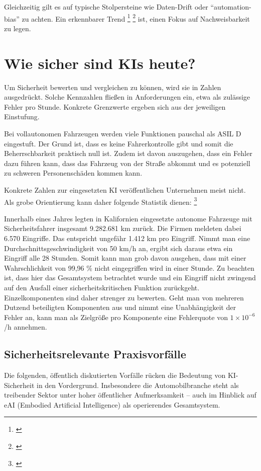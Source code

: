 Gleichzeitig gilt es auf typische Stolpersteine wie Daten-Drift oder ``automation-bias'' zu achten. 
Ein erkennbarer Trend 
\footnote{ \parencite{conduit2017-superalloy-nn}} \footnote{ \parencite{alphafold-nature-2021}}
ist, einen Fokus auf Nachweisbarkeit zu legen.



\section{Wie sicher sind KIs heute?}
Um Sicherheit bewerten und vergleichen zu können, wird sie in Zahlen ausgedrückt. 
Solche Kennzahlen fließen in Anforderungen ein, etwa als zulässige Fehler pro Stunde. 
Konkrete Grenzwerte ergeben sich aus der jeweiligen Einstufung.

Bei vollautonomen Fahrzeugen werden viele Funktionen pauschal als ASIL D eingestuft. 
Der Grund ist, dass es keine Fahrerkontrolle gibt und somit die Beherrschbarkeit praktisch null ist. 
Zudem ist davon auszugehen, dass ein Fehler dazu führen kann, dass das Fahrzeug von der Straße 
abkommt und es potenziell zu schweren Personenschäden kommen kann.

Konkrete Zahlen zur eingesetzten KI veröffentlichen Unternehmen meist nicht. 
Als grobe Orientierung kann daher folgende Statistik dienen: \footnote{ \parencite{herger2024disengagements}}

Innerhalb eines Jahres legten in Kalifornien eingesetzte autonome Fahrzeuge mit 
Sicherheitsfahrer insgesamt 9.282.681 km zurück. Die Firmen meldeten dabei 6.570 Eingriffe. Das 
entspricht ungefähr 1.412 km pro Eingriff. Nimmt man eine Durchschnittsgeschwindigkeit von 50 km/h 
an, ergibt sich daraus etwa ein Eingriff alle 28 Stunden.
Somit kann man grob davon ausgehen, dass mit einer Wahrschlichkeit von 99,96 \% nicht eingegriffen wird in einer Stunde.
Zu beachten ist, dass hier das Gesamtsystem betrachtet wurde und ein Eingriff nicht zwingend 
auf den Ausfall einer sicherheitskritischen Funktion zurückgeht. Einzelkomponenten sind daher 
strenger zu bewerten. Geht man von mehreren Dutzend beteiligten Komponenten aus und nimmt eine 
Unabhängigkeit der Fehler an, kann man als Zielgröße pro Komponente eine 
Fehlerquote von $ 1\times10^{-6}$/h annehmen.


\subsection*{Sicherheitsrelevante Praxisvorfälle}\label{sec:praxis-vorfaelle}
Die folgenden, öffentlich diskutierten Vorfälle rücken die Bedeutung von KI-Sicherheit in den Vordergrund. 
Insbesondere die Automobilbranche steht als treibender Sektor unter hoher öffentlicher Aufmerksamkeit – auch im Hinblick auf 
eAI (Embodied Artificial Intelligence) als operierendes Gesamtsystem.

